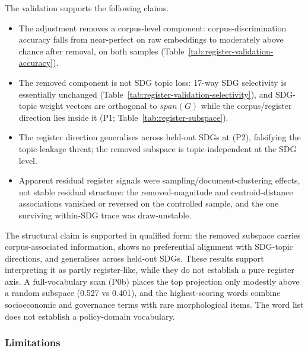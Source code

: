 \documentclass[12pt,a4paper]{article}
\begin{document}
The validation supports the following claims.
\begin{itemize}
  \item The adjustment removes a corpus-level component: corpus-discrimination accuracy falls from near-perfect on raw embeddings to moderately above chance after removal, on both samples (Table~\ref{tab:register-validation-accuracy}).
  \item The removed component is not SDG topic loss: 17-way SDG selectivity is essentially unchanged (Table~\ref{tab:register-validation-selectivity}), and SDG-topic weight vectors are orthogonal to $span(G)$ while the corpus/register direction lies inside it (P1; Table~\ref{tab:register-subspace}).
  \item The register direction generalises across held-out SDGs at \RegValPTwoHeldOut{} (P2), falsifying the topic-leakage threat; the removed subspace is topic-independent at the SDG level.
  \item Apparent residual register signals were sampling/document-clustering effects, not stable residual structure: the removed-magnitude and centroid-distance associations vanished or reversed on the controlled sample, and the one surviving within-SDG trace was draw-unstable.
\end{itemize}

The structural claim is supported in qualified form: the removed subspace carries corpus-associated information, shows no preferential alignment with SDG-topic directions, and generalises across held-out SDGs. These results support interpreting it as partly register-like, while they do not establish a pure register axis. A full-vocabulary scan (P0b) places the top projection only modestly above a random subspace (0.527 vs 0.401), and the highest-scoring words combine socioeconomic and governance terms with rare morphological items. The word list does not establish a policy-domain vocabulary.

\subsubsection{Limitations}
\label{sec:regval-limitations}
\end{document}
